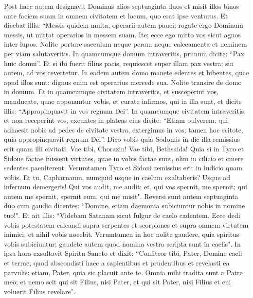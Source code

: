 \begin{biblechapter}  
\verse Post haec autem designavit Dominus alios septuaginta duos et misit illos binos ante faciem suam in omnem civitatem et locum, quo erat ipse venturus.  
\verse Et dicebat illis: “Messis quidem multa, operarii autem pauci; rogate ergo Dominum messis, ut mittat operarios in messem suam. 
\verse Ite; ecce ego mitto vos sicut agnos inter lupos. 
\verse Nolite portare sacculum neque peram neque calceamenta et neminem per viam salutaveritis. 
\verse In quamcumque domum intraveritis, primum dicite: “Pax huic domui”. 
\verse Et si ibi fuerit filius pacis, requiescet super illam pax vestra; sin autem, ad vos revertetur. 
\verse In eadem autem domo manete edentes et bibentes, quae apud illos sunt: dignus enim est operarius mercede sua. Nolite transire de domo in domum. 
\verse Et in quamcumque civitatem intraveritis, et susceperint vos, manducate, quae apponuntur vobis, 
\verse et curate infirmos, qui in illa sunt, et dicite illis: “Appropinquavit in vos regnum Dei”. 
\verse In quamcumque civitatem intraveritis, et non receperint vos, exeuntes in plateas eius dicite: 
\verse “Etiam pulverem, qui adhaesit nobis ad pedes de civitate vestra, extergimus in vos; tamen hoc scitote, quia appropinquavit regnum Dei”. 
\verse Dico vobis quia Sodomis in die illa remissius erit quam illi civitati. 
\verse Vae tibi, Chorazin! Vae tibi, Bethsaida! Quia si in Tyro et Sidone factae fuissent virtutes, quae in vobis factae sunt, olim in cilicio et cinere sedentes paeniterent. 
\verse Verumtamen Tyro et Sidoni remissius erit in iudicio quam vobis. 
\verse Et tu, Capharnaum, numquid usque in caelum exaltaberis? Usque ad infernum demergeris! 
\verse Qui vos audit, me audit; et, qui vos spernit, me spernit; qui autem me spernit, spernit eum, qui me misit". 
\verse Reversi sunt autem septuaginta duo cum gaudio dicentes: “Domine, etiam daemonia subiciuntur nobis in nomine tuo!". 
\verse Et ait illis: “Videbam Satanam sicut fulgur de caelo cadentem. 
\verse Ecce dedi vobis potestatem calcandi supra serpentes et scorpiones et supra omnem virtutem inimici; et nihil vobis nocebit. 
\verse Verumtamen in hoc nolite gaudere, quia spiritus vobis subiciuntur; gaudete autem quod nomina vestra scripta sunt in caelis". 
\verse In ipsa hora exsultavit Spiritu Sancto et dixit: “Confiteor tibi, Pater, Domine caeli et terrae, quod abscondisti haec a sapientibus et prudentibus et revelasti ea parvulis; etiam, Pater, quia sic placuit ante te. 
\verse Omnia mihi tradita sunt a Patre meo; et nemo scit qui sit Filius, nisi Pater, et qui sit Pater, nisi Filius et cui voluerit Filius revelare". 

\end{biblechapter}
